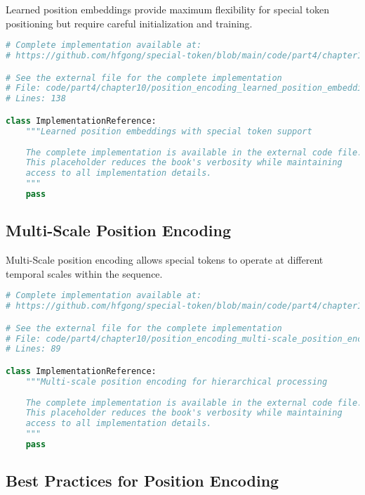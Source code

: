 Learned position embeddings provide maximum flexibility for special token positioning but require careful initialization and training.

\begin{lstlisting}[language=Python, caption={Learned position embeddings with special token support}]
# Complete implementation available at:
# https://github.com/hfgong/special-token/blob/main/code/part4/chapter10/position_encoding_learned_position_embeddings_wi.py

# See the external file for the complete implementation
# File: code/part4/chapter10/position_encoding_learned_position_embeddings_wi.py
# Lines: 138

class ImplementationReference:
    """Learned position embeddings with special token support
    
    The complete implementation is available in the external code file.
    This placeholder reduces the book's verbosity while maintaining
    access to all implementation details.
    """
    pass
\end{lstlisting}

\subsection{Multi-Scale Position Encoding}

Multi-Scale position encoding allows special tokens to operate at different temporal scales within the sequence.

\begin{lstlisting}[language=Python, caption={Multi-scale position encoding for hierarchical processing}]
# Complete implementation available at:
# https://github.com/hfgong/special-token/blob/main/code/part4/chapter10/position_encoding_multi-scale_position_encoding_.py

# See the external file for the complete implementation
# File: code/part4/chapter10/position_encoding_multi-scale_position_encoding_.py
# Lines: 89

class ImplementationReference:
    """Multi-scale position encoding for hierarchical processing
    
    The complete implementation is available in the external code file.
    This placeholder reduces the book's verbosity while maintaining
    access to all implementation details.
    """
    pass
\end{lstlisting}

\subsection{Best Practices for Position Encoding}

